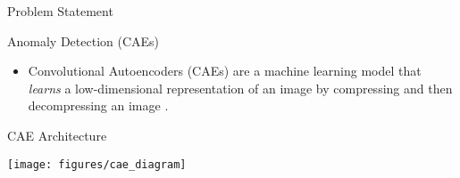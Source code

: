 \documentclass[10pt]{beamer}
\begin{document}
\begin{frame}{Problem Statement}
\begin{itemize}
%
%
%
%
%
%
%

\begin{frame}{Anomaly Detection (CAEs)}

\begin{itemize}
\item Convolutional Autoencoders (CAEs) are a machine learning model that \textit{learns} a low-dimensional representation of an image by compressing and then decompressing an image \cite{wta_detection, attention_anomalies}.\\[1cm]
\end{itemize}

\begin{exampleblock}{CAE Architecture}
\begin{center}
\texttt{[image: figures/cae\_diagram]}
\end{center}
\end{exampleblock}

\end{frame}


\end{itemize}
\end{frame}
\end{document}
